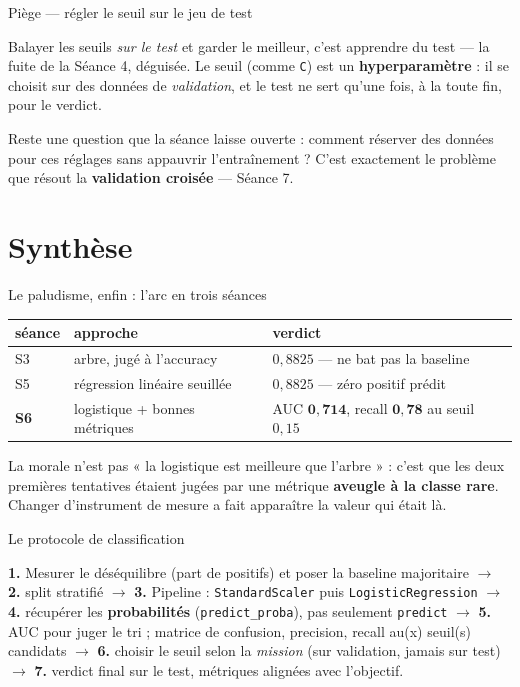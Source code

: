 \documentclass[aspectratio=169,11pt]{beamer}
\begin{document}
\begin{frame}{Piège — régler le seuil sur le jeu de test}
\begin{ucadpiege}
{\small Balayer les seuils \emph{sur le test} et garder le meilleur, c'est apprendre du test — la fuite de la Séance 4, déguisée. Le seuil (comme \texttt{C}) est un \textbf{hyperparamètre} : il se choisit sur des données de \emph{validation}, et le test ne sert qu'une fois, à la toute fin, pour le verdict.}
\end{ucadpiege}
{\small Reste une question que la séance laisse ouverte : comment réserver des données pour ces réglages sans appauvrir l'entraînement ? C'est exactement le problème que résout la \textbf{validation croisée} — Séance 7.}
\end{frame}

\section{Synthèse}

\begin{frame}{Le paludisme, enfin : l'arc en trois séances}
\begin{ucadex}
{\small \begin{center}\renewcommand{\arraystretch}{1.12}\begin{tabular}{l|l|l}
séance & approche & verdict\\\hline
S3 & arbre, jugé à l'accuracy & $0{,}8825$ — ne bat pas la baseline\\
S5 & régression linéaire seuillée & $0{,}8825$ — zéro positif prédit\\
\textbf{S6} & logistique + bonnes métriques & AUC $\mathbf{0{,}714}$, recall $\mathbf{0{,}78}$ au seuil $0{,}15$\\
\end{tabular}\end{center}
La morale n'est pas « la logistique est meilleure que l'arbre » : c'est que les deux premières tentatives étaient jugées par une métrique \textbf{aveugle à la classe rare}. Changer d'instrument de mesure a fait apparaître la valeur qui était là.}
\end{ucadex}
\end{frame}

\begin{frame}{Le protocole de classification}
\begin{ucadret}
{\small \textbf{1.} Mesurer le déséquilibre (part de positifs) et poser la baseline majoritaire $\to$ \textbf{2.} split stratifié $\to$ \textbf{3.} Pipeline : \texttt{StandardScaler} puis \texttt{LogisticRegression} $\to$ \textbf{4.} récupérer les \textbf{probabilités} (\texttt{predict\_proba}), pas seulement \texttt{predict} $\to$ \textbf{5.} AUC pour juger le tri ; matrice de confusion, precision, recall au(x) seuil(s) candidats $\to$ \textbf{6.} choisir le seuil selon la \emph{mission} (sur validation, jamais sur test) $\to$ \textbf{7.} verdict final sur le test, métriques alignées avec l'objectif.}
\end{ucadret}
\end{frame}
\end{document}
